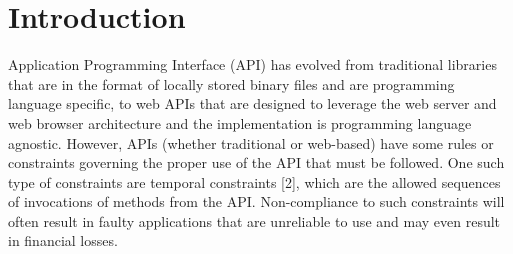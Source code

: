 \section{Introduction}
\label{sec:introduction}




Application Programming Interface (API) has evolved from traditional libraries that are in the format of locally stored binary files and are programming language specific,
to web APIs that are designed to leverage the web server and web browser architecture and the implementation is programming language agnostic.
However, APIs (whether traditional or web-based) have some rules or constraints governing the proper use of the API that must be followed.
One such type of constraints are temporal constraints [2], which are the allowed sequences of invocations of methods from the API.
Non-compliance to such constraints will often result in faulty applications that are unreliable to use and may even result in financial losses.


